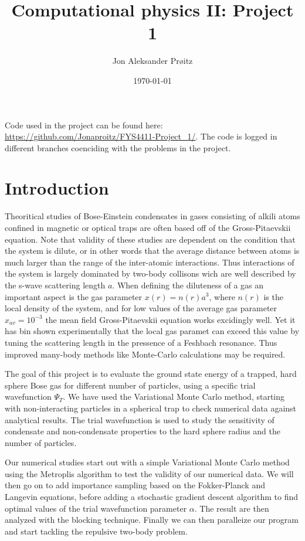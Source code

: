 \documentclass[a4paper, 10pt, english]{revtex4-2} %
\begin{document}
\vspace*{1.5cm}
\title{\LARGE Computational physics II: Project 1}
\author{Jon Aleksander Prøitz}
\date{\today}
\noaffiliation
\maketitle

Code used in the project can be found here:
\url{https://github.com/Jonaproitz/FYS4411-Project_1/}.
The code is logged in different branches coenciding with the problems in the project.

\section{\large Introduction}
    Theoritical studies of Bose-Einstein condensates in gases consisting of alkili atoms confined in magnetic or optical traps are often based off of the Gross-Pitaevskii equation. 
    Note that validity of these studies are dependent on the condition that the system is dilute, or in other words that the average distance between atoms is much larger than the range of the inter-atomic interactions. 
    Thus interactions of the system is largely dominated by two-body collisons wich are well described by the s-wave scattering length $a$.
    When defining the diluteness of a gas an important aspect is the gas parameter $x(r) = n(r)a^3$, where $n(r)$ is the local density of the system, and for low values of the average gas parameter $x_{av} = 10^{-3}$ the mean field Gross-Pitaevskii equation works excidingly well.
    Yet it has bin shown experimentally that the local gas paramet can exceed this value by tuning the scattering length in the pressence of a Feshbach resonance.
    Thus improved many-body methods like Monte-Carlo calculations may be required.


    The goal of this project is to evaluate the ground state energy of a trapped, hard sphere Bose gas for different number of particles, using a specific trial wavefunction $\Psi_T$.
    We have used the Variational Monte Carlo method, starting with non-interacting particles in a spherical trap to check numerical data against analytical results.
    The trial wavefunction is used to study the sensitivity of condensate and non-condensate properties to the hard sphere radius and the number of particles.

    Our numerical studies start out with a simple Variational Monte Carlo method using the Metroplis algorithm to test the validity of our numerical data.
    We will then go on to add importance sampling based on the Fokker-Planck and Langevin equations, before adding a stochastic gradient descent algorithm to find optimal values of the trial wavefunction parameter $\alpha$.
    The result are then analyzed with the blocking technique.
    Finally we can then paralleize our program and start tackling the repulsive two-body problem.
\end{document}
